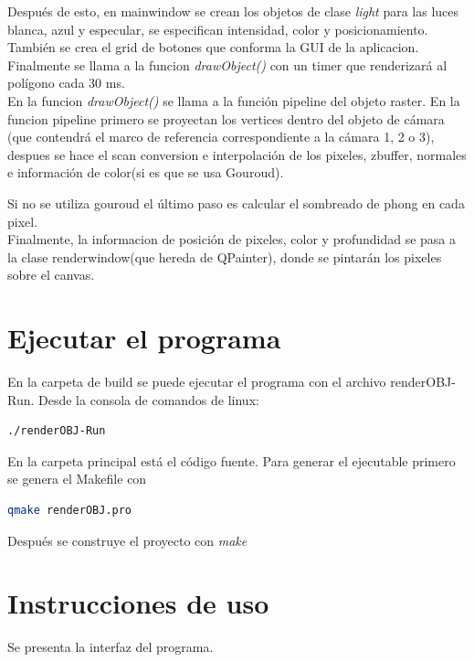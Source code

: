 \documentclass[12pt]{article}
\begin{document}
Después de esto, en mainwindow se crean los objetos de clase \textit{light} para las luces blanca, azul y especular, se especifican intensidad, color y posicionamiento. También se crea el grid de botones que conforma la GUI de la aplicacion. Finalmente se llama a la funcion \textit{drawObject()} con un timer que renderizará al polígono cada 30 ms.
\\

En la funcion  \textit{drawObject()} se llama a la función pipeline del objeto raster. En la funcion pipeline primero se proyectan los vertices dentro del objeto de cámara (que contendrá el marco de referencia correspondiente a la cámara 1, 2 o 3),
despues se hace el scan conversion e interpolación de los pixeles, zbuffer, normales e información de color(si es que se usa Gouroud).

Si no se utiliza gouroud el último paso es calcular el sombreado de phong en cada pixel.
\\

Finalmente, la informacion de posición de pixeles, color y profundidad se pasa a la clase renderwindow(que hereda de QPainter), donde se pintarán los pixeles sobre el canvas.




\section{Ejecutar el programa}
En la carpeta de build se puede ejecutar el programa con el archivo renderOBJ-Run. Desde la consola de comandos de linux:

\begin{lstlisting}[language=bash,title={bash}]
./renderOBJ-Run
\end{lstlisting}


En la carpeta principal está el código fuente. Para generar el ejecutable primero se genera el Makefile con

\begin{lstlisting}[language=bash,title={bash}]
 qmake renderOBJ.pro
\end{lstlisting}

Después se construye el proyecto con \textit{make}



\section{Instrucciones de uso}
Se presenta la interfaz del programa.
\end{document}
